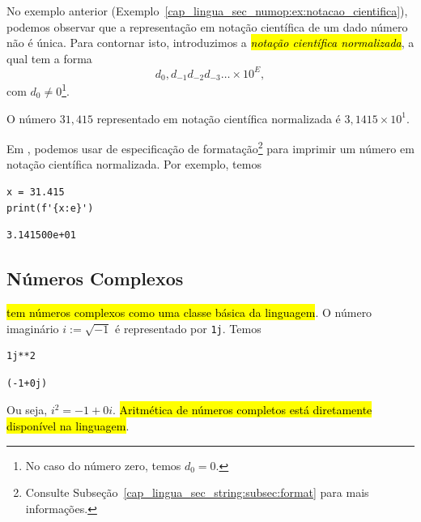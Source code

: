 No exemplo anterior (Exemplo~\ref{cap_lingua_sec_numop:ex:notacao_cientifica}), podemos observar que a representação em notação científica de um dado número não é única. Para contornar isto, introduzimos a \hl{\emph{notação científica normalizada}}, a qual tem a forma
\begin{equation}
  d_0,d_{-1}d_{-2}d_{-3}\ldots\times 10^{E},
\end{equation}
com $d_0 \neq 0$\footnote{No caso do número zero, temos $d_0=0$.}.

\begin{ex}
  O número $31,415$ representado em notação científica normalizada é $3,1415\times 10^{1}$.

  Em {\python}, podemos usar de especificação de formatação\footnote{Consulte Subseção~\ref{cap_lingua_sec_string:subsec:format} para mais informações.} para imprimir um número em notação científica normalizada. Por exemplo, temos

\begin{lstlisting}
x = 31.415
print(f'{x:e}')
\end{lstlisting}

\begin{verbatim}
3.141500e+01
\end{verbatim}

\end{ex}

\subsection{Números Complexos}

\hl{{\python} tem números complexos como uma classe básica da linguagem}. O número imaginário $i := \sqrt{-1}$ é representado por \texttt{1j}. Temos

\begin{lstlisting}
1j**2
\end{lstlisting}

\begin{verbatim}
(-1+0j)
\end{verbatim}

Ou seja, $i^2 = -1 + 0i$. \hl{Aritmética de números completos está diretamente disponível na linguagem}.


